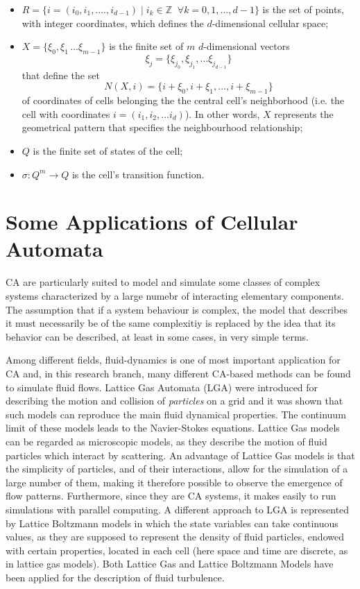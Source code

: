 \begin{itemize}
\item $R = \{i = (i_0,i_1,....,i_{d-1}) \; | \; i_k \in \mathbb{Z} \;\; \forall k =
  0,1,...,d-1\}$ is the set of points, with integer coordinates, which
  defines the $d$-dimensional cellular space;

\item $X = \{\xi_0,\xi_1\,...\xi_{m-1}\}$ is the finite set of $m$
  $d$-dimensional vectors
  \[ \xi_j = \{\xi_{j_0},\xi_{j_1},...\xi_{j_{d-1}}\} \]
  that define the set
  \[ N(X,i) = \{i + \xi_0,i + \xi_1,...,i + \xi_{m-1}\} \]
  of coordinates of cells belonging the the central cell's
  neighborhood (i.e. the cell with coordinates $i =
  (i_1,i_2,...i_d)$). In other words, $X$ represents the geometrical
  pattern that specifies the neighbourhood relationship;
  
\item $Q$ is the finite set of states of the cell;
  
\item $\sigma : Q^m \rightarrow Q$ is the cell's transition function.

\end{itemize}


\section{Some Applications of Cellular Automata}

CA are particularly suited to model and simulate some classes of
complex systems characterized by a large numebr of interacting
elementary components.  The assumption that if a system behaviour is
complex, the model that describes it must necessarily be of the same
complexitiy is replaced by the idea that its behavior can be
described, at least in some cases, in very simple terms.

Among different fields, fluid-dynamics is one of most important
application for CA and, in this research branch, many different
CA-based methods can be found to simulate fluid flows.  Lattice Gas
Automata (LGA) were introduced for describing the motion and collision of
\emph{particles} on a grid and it was shown that such models can
reproduce the main fluid dynamical properties. The continuum limit of
these models leads to the Navier-Stokes equations. Lattice Gas models
can be regarded as microscopic models, as they describe the motion of
fluid particles which interact by scattering. An advantage of Lattice
Gas models is that the simplicity of particles, and of their
interactions, allow for the simulation of a large number of them,
making it therefore possible to observe the emergence of flow
patterns. Furthermore, since they are CA systems, it makes easily to
run simulations with parallel computing. A different approach to LGA
is represented by Lattice Boltzmann models in which the state
variables can take continuous values, as they are supposed to
represent the density of fluid particles, endowed with certain
properties, located in each cell (here space and time are discrete, as
in lattice gas models). Both Lattice Gas and Lattice Boltzmann Models
have been applied for the description of fluid turbulence.

